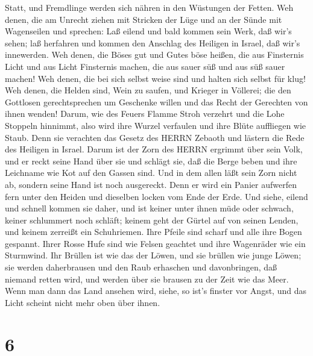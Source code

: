 Statt, und Fremdlinge werden sich nähren in den Wüstungen der Fetten.
 Weh denen, die am Unrecht ziehen mit Stricken der Lüge und
an der Sünde mit Wagenseilen  und sprechen: Laß eilend und
bald kommen sein Werk, daß wir's sehen; laß herfahren und kommen den
Anschlag des Heiligen in Israel, daß wir's innewerden.  Weh
denen, die Böses gut und Gutes böse heißen, die aus Finsternis Licht und
aus Licht Finsternis machen, die aus sauer süß und aus süß sauer machen!
 Weh denen, die bei sich selbst weise sind und halten sich
selbst für klug!  Weh denen, die Helden sind, Wein zu
saufen, und Krieger in Völlerei;  die den Gottlosen
gerechtsprechen um Geschenke willen und das Recht der Gerechten von
ihnen wenden!  Darum, wie des Feuers Flamme Stroh verzehrt
und die Lohe Stoppeln hinnimmt, also wird ihre Wurzel verfaulen und ihre
Blüte auffliegen wie Staub. Denn sie verachten das Gesetz des HERRN
Zebaoth und lästern die Rede des Heiligen in Israel.  Darum
ist der Zorn des HERRN ergrimmt über sein Volk, und er reckt seine Hand
über sie und schlägt sie, daß die Berge beben und ihre Leichname wie Kot
auf den Gassen sind. Und in dem allen läßt sein Zorn nicht ab, sondern
seine Hand ist noch ausgereckt.  Denn er wird ein Panier
aufwerfen fern unter den Heiden und dieselben locken vom Ende der Erde.
Und siehe, eilend und schnell kommen sie daher,  und ist
keiner unter ihnen müde oder schwach, keiner schlummert noch schläft;
keinem geht der Gürtel auf von seinen Lenden, und keinem zerreißt ein
Schuhriemen.  Ihre Pfeile sind scharf und alle ihre Bogen
gespannt. Ihrer Rosse Hufe sind wie Felsen geachtet und ihre Wagenräder
wie ein Sturmwind.  Ihr Brüllen ist wie das der Löwen, und
sie brüllen wie junge Löwen; sie werden daherbrausen und den Raub
erhaschen und davonbringen, daß niemand retten wird,  und
werden über sie brausen zu der Zeit wie das Meer. Wenn man dann das Land
ansehen wird, siehe, so ist's finster vor Angst, und das Licht scheint
nicht mehr oben über ihnen.

\hypertarget{section-5}{%
\section{6}\label{section-5}}

